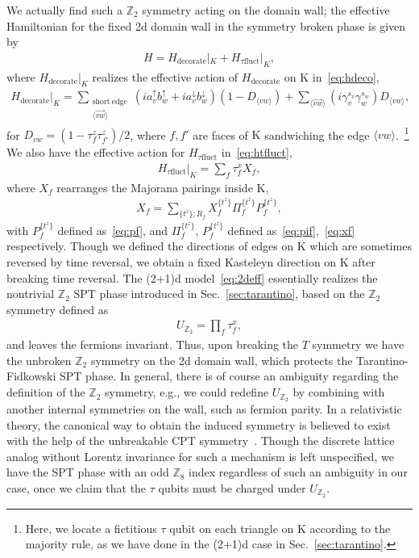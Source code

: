 \documentclass[12pt]{article}
\numberwithin{equation}{section}
\begin{document}
We actually find such a $\mathbb{Z}_2$ symmetry acting on the domain wall; the effective Hamiltonian for the fixed 2d domain wall in the symmetry broken phase is given by
\begin{align}
    H=H_{\mathrm{decorate}}|_{K}+H_{\tau\mathrm{fluct}}|_{K},
    \label{eq:2deff}
\end{align}
where $H_{\mathrm{decorate}}|_{K}$ realizes the effective action of $H_{\mathrm{decorate}}$ on $\mathrm{K}$ in~\eqref{eq:hdeco},
\begin{align}
    H_{\mathrm{decorate}}|_{K}=\sum_{\substack{\mathrm{short\ edge}\\ \langle\overrightarrow{vw}\rangle}}(ia_v^{\uparrow}b_{w}^{\uparrow}+ia_v^{\downarrow}b_{w}^{\downarrow})(1-D_{\langle vw\rangle})+\sum_{\langle \overrightarrow{vw}\rangle}(i\gamma_v^{s_v}\gamma_{w}^{s_w})D_{\langle vw\rangle},
\end{align}
for $D_{vw}= (1-\tau_f^z\tau_{f'}^z)/2$, where $f, f'$ are faces of $\mathrm{K}$ sandwiching the edge $\langle vw\rangle$.~\footnote{Here, we locate a fictitious  $\tau$ qubit on each triangle on $\mathrm{K}$ according to the majority rule, as we have done in the (2+1)d case in Sec.~\ref{sec:tarantino}.} We also have the effective action for $H_{\tau\mathrm{fluct}}$ in~\eqref{eq:htfluct},
\begin{align}
    H_{\tau\mathrm{fluct}}|_{K}=\sum_f \tau_f^x X_f,
\end{align}
where $X_f$ rearranges the Majorana pairings inside $\mathrm{K}$,
\begin{align}
    X_f=\sum_{\{t^z\};  R_f}X_f^{\{t^z\}}\Pi_f^{\{t^z\}}P_f^{\{t^z\}},
\end{align}
with $P_f^{\{t^z\}}$ defined as~\eqref{eq:pf}, and $\Pi_f^{\{t^z\}}$, $P_f^{\{t^z\}}$ defined as~\eqref{eq:pif},~\eqref{eq:xf} respectively.
Though we defined the directions of edges on $\mathrm{K}$ which are sometimes reversed by time reversal, we obtain a fixed Kasteleyn direction on $\mathrm{K}$ after breaking time reversal.
The (2+1)d model~\eqref{eq:2deff} essentially realizes the nontrivial $\mathbb{Z}_2$ SPT phase introduced in Sec.~\ref{sec:tarantino}, based on the $\mathbb{Z}_2$ symmetry defined as 
\begin{align}
    U_{\mathbb{Z}_2}=\prod_f \tau_f^x,
\end{align}
and leaves the fermions invariant. Thus, upon breaking the $T$ symmetry we have the unbroken $\mathbb{Z}_2$ symmetry on the 2d domain wall, which protects the Tarantino-Fidkowski SPT phase.
In general, there is of course an ambiguity regarding the definition of the $\mathbb{Z}_2$ symmetry, e.g., we could redefine $U_{\mathbb{Z}_2}$ by combining with another internal symmetries on the wall, such as fermion parity. In a relativistic theory, the canonical way to obtain the induced symmetry is believed to exist with the help of the unbreakable CPT symmetry~\cite{HKT2019CPT}.  
Though the discrete lattice analog without Lorentz invariance for such a mechanism is left unspecified, we have the SPT phase with an odd $\mathbb{Z}_8$ index regardless of such an ambiguity in our case, once we claim that the $\tau$ qubits must be charged under $U_{\mathbb{Z}_2}$.
\end{document}
